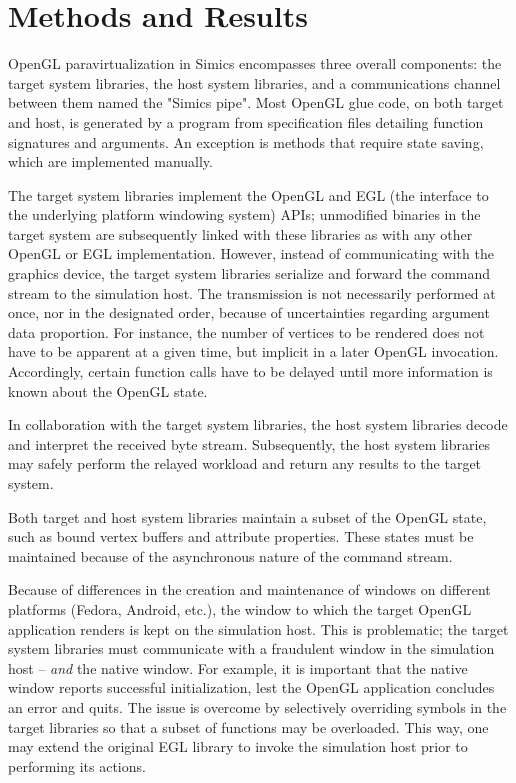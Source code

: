 
\section{Methods and Results}
\label{sec:methodsandresults}
OpenGL paravirtualization in Simics encompasses three overall components: the target system libraries, the host system libraries, and a communications channel between them named the "Simics pipe".
Most OpenGL glue code, on both target and host, is generated by a program from specification files detailing function signatures and arguments.
An exception is methods that require state saving, which are implemented manually.

The target system libraries implement the OpenGL and EGL (the interface to the underlying platform windowing system) APIs; unmodified binaries in the target system are subsequently linked with these libraries as with any other OpenGL or EGL implementation.
However, instead of communicating with the graphics device, the target system libraries serialize and forward the command stream to the simulation host.
The transmission is not necessarily performed at once, nor in the designated order, because of uncertainties regarding argument data proportion.
For instance, the number of vertices to be rendered does not have to be apparent at a given time, but implicit in a later OpenGL invocation.
Accordingly, certain function calls have to be delayed until more information is known about the OpenGL state.

In collaboration with the target system libraries, the host system libraries decode and interpret the received byte stream.
Subsequently, the host system libraries may safely perform the relayed workload and return any results to the target system.

Both target and host system libraries maintain a subset of the OpenGL state, such as bound vertex buffers and attribute properties.
These states must be maintained because of the asynchronous nature of the command stream.

Because of differences in the creation and maintenance of windows on different platforms (Fedora, Android, etc.), the window to which the target OpenGL application renders is kept on the simulation host.
This is problematic; the target system libraries must communicate with a fraudulent window in the simulation host -- \textit{and} the native window.
For example, it is important that the native window reports successful initialization, lest the OpenGL application concludes an error and quits.
The issue is overcome by selectively overriding symbols in the target libraries so that a subset of functions may be overloaded.
This way, one may extend the original EGL library to invoke the simulation host prior to performing its actions.

